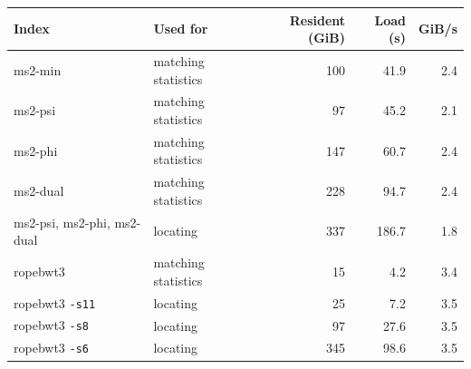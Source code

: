 \begin{tabular}{llrrr}
\hline
Index & Used for & Resident (GiB) & Load (s) & GiB/s \\
\hline
ms2-min & matching statistics & 100 & 41.9 & 2.4 \\
ms2-psi & matching statistics & 97 & 45.2 & 2.1 \\
ms2-phi & matching statistics & 147 & 60.7 & 2.4 \\
ms2-dual & matching statistics & 228 & 94.7 & 2.4 \\
ms2-psi, ms2-phi, ms2-dual & locating & 337 & 186.7 & 1.8 \\
ropebwt3 & matching statistics & 15 & 4.2 & 3.4 \\
ropebwt3 \texttt{-s11} & locating & 25 & 7.2 & 3.5 \\
ropebwt3 \texttt{-s8} & locating & 97 & 27.6 & 3.5 \\
ropebwt3 \texttt{-s6} & locating & 345 & 98.6 & 3.5 \\
\hline
\end{tabular}
